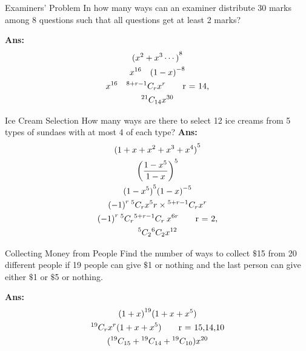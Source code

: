 \begin{exampletcb}{Examiners' Problem}{}
    In how many ways can an examiner distribute 30 marks among 8 questions such that all questions get at least 2 marks?

    \textbf{Ans:}
    \begin{gather*}
        {(x^2 + x^3 \cdots)}^8 \\
        x^{16}\quad {(1 - x)}^{-8}\\
        x^{16}\quad{}^{8 + r - 1}C_{r} x^r  \tag*{r = 14,} \\
        {}^{21}C_{14} x^{30}
    \end{gather*}
\end{exampletcb}
\begin{exampletcb}{Ice Cream Selection}{}
    How many ways are there to select 12 ice creams from 5 types of sundaes with at most 4 of each type?
    \textbf{Ans:}
    \begin{gather*}
        {(1 + x + x^2 + x^3 + x^4 )}^5 \\
        {\left(\frac{1 - x^5}{1 - x}\right)}^5 \\
        {(1 - x^5)}^5 {(1 - x)}^{-5}\\
        {( - 1)}^r\: {}^{5}C_{r} x^5r \times {}^{5 + r - 1}C_{r} x^r \\
        {( - 1)}^r\: {}^{5}C_{r} {}^{5 + r - 1}C_{r}\: x^{6r} \tag*{r = 2,} \\
        {}^{5}C_{2} {}^{6}C_{2} x^{12}
    \end{gather*}
\end{exampletcb}

\begin{exampletcb}{Collecting Money from People}{}
    Find the number of ways to collect \mbox{\(\mathdollar\)}15 from 20 different people if 19 people can give \mbox{\(\mathdollar\)}1 or nothing and the last person can give either \mbox{\(\mathdollar\)}1 or \mbox{\(\mathdollar\)}5 or nothing.

    \textbf{Ans:}\begin{gather*}
        {(1 + x)}^{19} {(1 + x + x^5)}\\
        {}^{19}C_{r} x^r {(1 + x + x^5)} \tag*{r = 15,14,10}\\
        {({}^{19}C_{15} + {}^{19}C_{14} +{}^{19}C_{10})} x^{20}
    \end{gather*}
\end{exampletcb}


